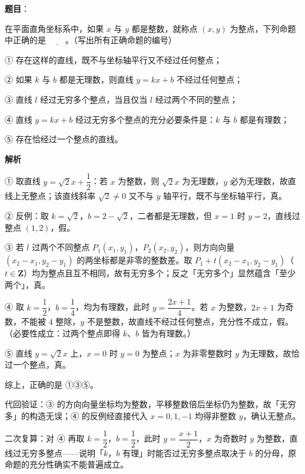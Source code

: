 \begin{answer}

\textbf{题目}：

在平面直角坐标系中，如果 $x$ 与 $y$ 都是整数，就称点 $(x,y)$ 为整点，下列命题中正确的是 $\underline{\qquad}$。（写出所有正确命题的编号）

① 存在这样的直线，既不与坐标轴平行又不经过任何整点；

② 如果 $k$ 与 $b$ 都是无理数，则直线 $y=kx+b$ 不经过任何整点；

③ 直线 $l$ 经过无穷多个整点，当且仅当 $l$ 经过两个不同的整点；

④ 直线 $y=kx+b$ 经过无穷多个整点的充分必要条件是：$k$ 与 $b$ 都是有理数；

⑤ 存在恰经过一个整点的直线。

\textbf{解析}

① 取直线 $y=\sqrt2x+\dfrac12$：若 $x$ 为整数，则 $\sqrt2x$ 为无理数，$y$ 必为无理数，故直线上无整点；该直线斜率 $\sqrt2\neq0$ 又不与 $y$ 轴平行，既不与坐标轴平行，真。

② 反例：取 $k=\sqrt2$，$b=2-\sqrt2$，二者都是无理数，但 $x=1$ 时 $y=2$，直线过整点 $(1,2)$，假。

③ 若 $l$ 过两个不同整点 $P_1(x_1,y_1)$，$P_2(x_2,y_2)$，则方向向量 $(x_2-x_1,y_2-y_1)$ 的两坐标都是非零的整数差。取 $P_1+t(x_2-x_1,y_2-y_1)$（$t\in\mathbf Z$）均为整点且互不相同，故有无穷多个；反之「无穷多个」显然蕴含「至少两个」，真。

④ 取 $k=\dfrac12$，$b=\dfrac14$，均为有理数，此时 $y=\dfrac{2x+1}{4}$。若 $x$ 为整数，$2x+1$ 为奇数，不能被 $4$ 整除，$y$ 不是整数，故直线不经过任何整点，充分性不成立，假。（必要性成立：过两个整点即得 $k$、$b$ 皆为有理数。）

⑤ 直线 $y=\sqrt2x$ 上，$x=0$ 时 $y=0$ 为整点；$x$ 为非零整数时 $y$ 为无理数，故恰过一个整点，真。

综上，正确的是 ①③⑤。

代回验证：③ 的方向向量坐标均为整数，平移整数倍后坐标仍为整数，故「无穷多」的构造无误；④ 的反例经直接代入 $x=0,1,-1$ 均得非整数 $y$，确认无整点。

二次复算：对 ④ 再取 $k=\dfrac12$，$b=\dfrac12$，此时 $y=\dfrac{x+1}{2}$，$x$ 为奇数时 $y$ 为整数，直线过无穷多整点——说明「$k$，$b$ 有理」时能否过无穷多整点取决于 $b$ 的分母，原命题的充分性确实不能普遍成立。


\end{answer}
